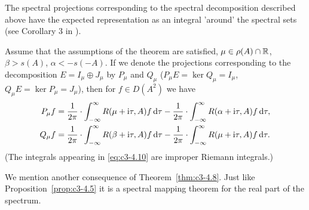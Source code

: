 The spectral projections corresponding to the spectral decomposition
described above have the expected representation as an integral
'around' the spectral sets (see Corollary 3 in \citet{greiner:1984c}).

\begin{corollary}\label{cor:c3-4.9}
Assume that the assumptions of the theorem are satisfied, $\mu \in \rho(A) \cap \mathbb{R} $, $\beta > s(A)$, $\alpha < -s(-A)$. If we denote the projections corresponding to the decomposition $E = I_{\mu} \oplus J_{\mu}$ by $P_{\mu}$ and $Q_{\mu}$
(\ie  $P_{\mu}E = \ker Q_{\mu} = I_{\mu}$, $Q_{\mu}E = \ker P_{\mu} = J_{\mu}$), then for $f \in D(A^2)$ we
have
\begin{equation}\label{eq:c3-4.10}
\begin{aligned}
	P_{\mu}f &= \frac{1}{2\pi} \cdot \int_{-\infty}^{\infty} R(\mu+\mathrm{i}\tau,A)f \mathop{}\!\mathrm{d}{\tau} - \frac{1}{2\pi} \cdot \int_{-\infty}^{\infty} R(\alpha+\mathrm{i}\tau,A)f \mathop{}\!\mathrm{d}{\tau} ,\\
	Q_{\mu}f &= \frac{1}{2\pi} \cdot \int_{-\infty}^{\infty} R(\beta+\mathrm{i}\tau,A)f \mathop{}\!\mathrm{d}{\tau} - \frac{1}{2\pi} \cdot \int_{-\infty}^{\infty} R(\mu+\mathrm{i}\tau,A)f \mathop{}\!\mathrm{d}{\tau} .
\end{aligned}
\end{equation}
(The integrals appearing in \eqref{eq:c3-4.10} are improper Riemann integrals.)
\end{corollary}
We mention another consequence of Theorem~\ref{thm:c3-4.8}. Just like Proposition~\ref{prop:c3-4.5} it is a
spectral mapping theorem for the real part of the spectrum.

